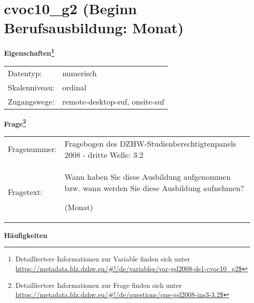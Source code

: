 
    \setcounter{footnote}{0}

    \vspace*{-1.8cm}
	\section{cvoc10\_g2 (Beginn Berufsausbildung: Monat)}
	\label{section:cvoc10_g2}



    \vspace*{0.5cm}
    \noindent\textbf{Eigenschaften\footnote{Detailliertere Informationen zur Variable finden sich unter
		\url{https://metadata.fdz.dzhw.eu/\#!/de/variables/var-gsl2008-ds1-cvoc10_g2$}}}\\
	\begin{tabularx}{\hsize}{@{}lX}
	Datentyp: & numerisch \\
	Skalenniveau: & ordinal \\
	Zugangswege: &
	  remote-desktop-suf, 
	  onsite-suf
 \\
    \end{tabularx}



				\vspace*{0.5cm}
                \noindent\textbf{Frage\footnote{Detailliertere Informationen zur Frage finden sich unter
		              \url{https://metadata.fdz.dzhw.eu/\#!/de/questions/que-gsl2008-ins3-3.2$}}}\\
				\begin{tabularx}{\hsize}{@{}lX}
					Fragenummer: &
					  Fragebogen des DZHW-Studienberechtigtenpanels 2008 - dritte Welle:
					  3.2
 \\
					Fragetext: & Wann haben Sie diese Ausbildung aufgenommen bzw. wann werden Sie diese Ausbildung aufnehmen?\par  (Monat) \\
				\end{tabularx}





        		\vspace*{0.5cm}
                \noindent\textbf{Häufigkeiten}

